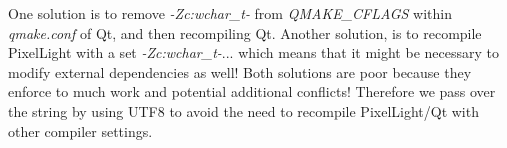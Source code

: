 One solution is to remove \emph{-Zc:wchar\_t-} from \emph{QMAKE\_CFLAGS} within \emph{qmake.conf} of Qt, and then recompiling Qt. Another solution,  is to recompile PixelLight with a set \emph{-Zc:wchar\_t-}... which means that it might be necessary to modify external dependencies as well! Both solutions are poor because they enforce to much work and potential additional conflicts! Therefore we pass over the string by using UTF8 to avoid the need to recompile PixelLight/Qt with other compiler settings.
